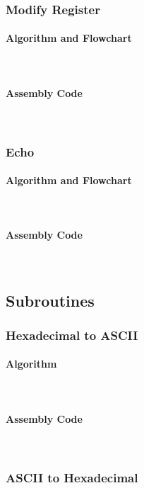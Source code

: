 \documentclass[12pt]{article}
\begin{document}
			\subsubsection{Modify Register}
			\paragraph{Algorithm and Flowchart}~\\
			\paragraph{Assembly Code}~\\				
			
			\subsubsection{Echo}
			\paragraph{Algorithm and Flowchart}~\\
			\paragraph{Assembly Code}~\\				
			
			\subsection{Subroutines}
			
			\subsubsection{Hexadecimal to ASCII}
			\paragraph{Algorithm}~\\
			\paragraph{Assembly Code}~\\				
			
			\subsubsection{ASCII to Hexadecimal}
\end{document}
